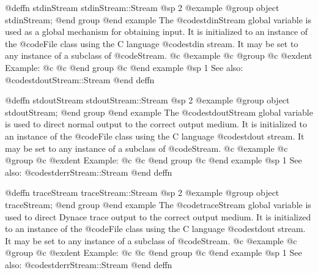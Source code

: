 @deffn {stdinStream} stdinStream::Stream
@sp 2
@example
@group
object  stdinStream;
@end group
@end example
The @code{stdinStream} global variable is used as a global mechanism for
obtaining input.  It is initialized to an instance of the @code{File}
class using the C language @code{stdin} stream.  It may be set to any
instance of a subclass of @code{Stream}.
@c @example
@c @group
@c @exdent Example:
@c 
@c @end group
@c @end example
@sp 1
See also:  @code{stdoutStream::Stream}
@end deffn








@deffn {stdoutStream} stdoutStream::Stream
@sp 2
@example
@group
object  stdoutStream;
@end group
@end example
The @code{stdoutStream} global variable is used to direct normal
output to the correct output medium.  It is initialized to
an instance of the @code{File} class using the C language
@code{stdout} stream.  It may be set to any instance of a
subclass of @code{Stream}.
@c @example
@c @group
@c @exdent Example:
@c 
@c @end group
@c @end example
@sp 1
See also:  @code{stderrStream::Stream}
@end deffn










@deffn {traceStream} traceStream::Stream
@sp 2
@example
@group
object  traceStream;
@end group
@end example
The @code{traceStream} global variable is used to direct Dynace
trace output to the correct output medium.  It is initialized to
an instance of the @code{File} class using the C language
@code{stdout} stream.  It may be set to any instance of a
subclass of @code{Stream}.
@c @example
@c @group
@c @exdent Example:
@c 
@c @end group
@c @end example
@sp 1
See also:  @code{stderrStream::Stream}
@end deffn









